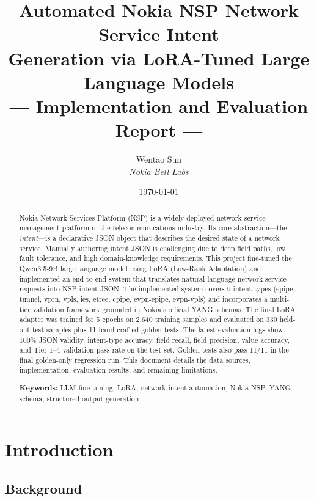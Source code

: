 \documentclass[12pt, a4paper]{article}
\title{%
  \vspace{-1cm}
  {\LARGE\bfseries Automated Nokia NSP Network Service Intent\\[4pt]
  Generation via LoRA-Tuned Large Language Models}\\[12pt]
  {\large --- Implementation and Evaluation Report ---}
}
\author{%
  Wentao Sun \\[3pt]
  {\small\textit{Nokia Bell Labs}}
}
\date{\today}
\newcommand{\yang}{\textsc{YANG}}
\newcommand{\nsp}{\textsc{NSP}}
\newcommand{\lora}{\textsc{LoRA}}
\begin{document}
\maketitle
\thispagestyle{empty}

\begin{abstract}
\noindent
Nokia Network Services Platform (\nsp{}) is a widely deployed network service management platform in the telecommunications industry. Its core abstraction---the \emph{intent}---is a declarative JSON object that describes the desired state of a network service. Manually authoring intent JSON is challenging due to deep field paths, low fault tolerance, and high domain-knowledge requirements. This project fine-tuned the Qwen3.5-9B large language model using \lora{} (Low-Rank Adaptation) and implemented an end-to-end system that translates natural language network service requests into \nsp{} intent JSON. The implemented system covers 9 intent types (epipe, tunnel, vprn, vpls, ies, etree, cpipe, evpn-epipe, evpn-vpls) and incorporates a multi-tier validation framework grounded in Nokia's official \yang{} schemas. The final LoRA adapter was trained for 5 epochs on 2,640 training samples and evaluated on 330 held-out test samples plus 11 hand-crafted golden tests. The latest evaluation logs show 100\% JSON validity, intent-type accuracy, field recall, field precision, value accuracy, and Tier 1--4 validation pass rate on the test set. Golden tests also pass 11/11 in the final golden-only regression run. This document details the data sources, implementation, evaluation results, and remaining limitations.

\vspace{6pt}
\noindent\textbf{Keywords:} LLM fine-tuning, LoRA, network intent automation, Nokia NSP, YANG schema, structured output generation
\end{abstract}

\newpage
\tableofcontents
\newpage

\section{Introduction}

\subsection{Background}
\end{document}
